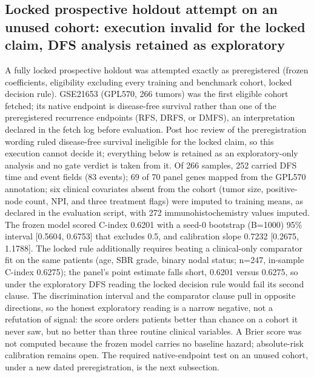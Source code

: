 \documentclass[12pt,a4paper]{article}
\begin{document}
\subsection{Locked prospective holdout attempt on an unused cohort: execution invalid for the locked claim, DFS analysis retained as exploratory}
A fully locked prospective holdout was attempted exactly as preregistered
(frozen coefficients, eligibility excluding every training and benchmark
cohort, locked decision rule). GSE21653 (GPL570, 266 tumors) was the first
eligible cohort fetched; its native endpoint is disease-free survival rather
than one of the preregistered recurrence endpoints (RFS, DRFS, or DMFS), an
interpretation declared in the fetch log before evaluation. Post hoc review of
the preregistration wording ruled disease-free survival ineligible for the
locked claim, so this execution cannot decide it; everything below is retained
as an exploratory-only analysis and no gate verdict is taken from it. Of 266 samples, 252 carried DFS time and
event fields (83 events); 69 of 70 panel genes mapped from the GPL570
annotation; six clinical covariates absent from the cohort (tumor size,
positive-node count, NPI, and three treatment flags) were imputed to training
means, as declared in the evaluation script, with 272 immunohistochemistry
values imputed. The frozen model scored C-index 0.6201 with a
seed-0 bootstrap (B=1000) 95\% interval [0.5604, 0.6753] that excludes 0.5,
and calibration slope 0.7232 [0.2675, 1.1788]. The locked rule additionally
requires beating a clinical-only comparator fit on the same patients
(age, SBR grade, binary nodal status; n=247, in-sample C-index 0.6275); the
panel's point estimate falls short, 0.6201 versus 0.6275, so under the
exploratory DFS reading the locked decision rule would fail its second
clause. The discrimination interval and the comparator clause pull in
opposite directions, so the honest exploratory reading is a narrow negative,
not a refutation of signal: the score orders patients better than chance on
a cohort it never saw, but no better than three routine clinical variables.
A Brier score was not computed because the frozen model carries no
baseline hazard; absolute-risk calibration remains open. The required native-endpoint
test on an unused cohort, under a new dated preregistration, is the next subsection.
\end{document}
